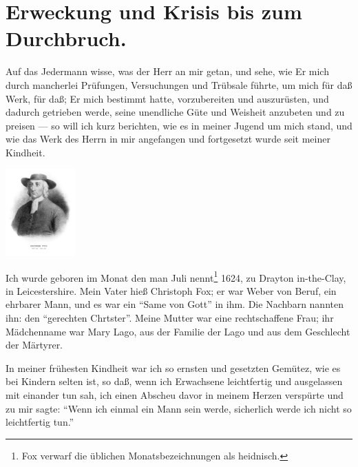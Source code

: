 \chapter[Erweckung und Krisis]{Erweckung und Krisis bis zum Durchbruch.}




Auf das Jedermann wisse, was der Herr an mir getan, und
sehe, wie Er mich durch mancherlei Prüfungen, Versuchungen und
Trübsale führte, um mich für daß Werk, für daß; Er mich bestimmt 
hatte, vorzubereiten und auszurüsten, und dadurch getrieben 
werde, seine unendliche Güte und Weisheit anzubeten und
zu preisen — so will ich kurz berichten, wie es in meiner Jugend
um mich stand, und wie das Werk des Herrn in mir angefangen
und fortgesetzt wurde seit meiner Kindheit.

\begin{floatingfigure}[3]{4cm}
\includegraphics[width=0.20\textwidth]{./pics/Fox-George-LOC.png}
\label{bild:gfox} 
\end{floatingfigure}




Ich wurde geboren im Monat den man Juli nennt\footnote{Fox 
verwarf die üblichen Monatsbezeichnungen als heidnisch.} 1624,
zu Drayton in-the-Clay, in Leicestershire. Mein Vater hieß
Christoph Fox; er war Weber von Beruf, ein ehrbarer Mann,
und es war ein "`Same von Gott"' in ihm. Die Nachbarn
nannten ihn: den "`gerechten Chrtster"'. Meine Mutter war eine
rechtschaffene Frau; ihr Mädchenname war Mary Lago, aus der
Familie der Lago und aus dem Geschlecht der Märtyrer.

In meiner frühesten Kindheit war ich so ernsten und gesetzten
Gemütez, wie es bei Kindern selten ist, so daß, wenn ich Erwachsene 
leichtfertig und ausgelassen mit einander tun sah, ich
einen Abscheu davor in meinem Herzen verspürte und zu mir
sagte: "`Wenn ich einmal ein Mann sein werde, sicherlich werde
ich nicht so leichtfertig tun."'

